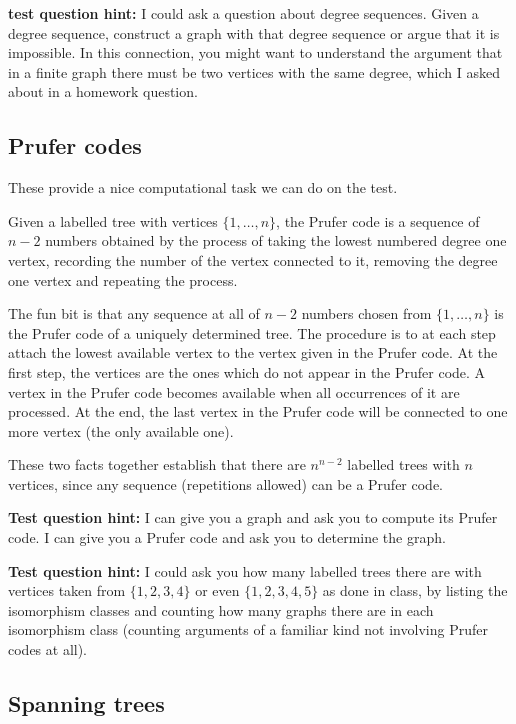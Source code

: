 \documentclass[12pt]{article}
\begin{document}
{\bf test question hint:}  I could ask a question about degree sequences.  Given a degree sequence, construct a graph with that degree sequence or argue that it is impossible.  In this connection, you might want to understand the argument that
in a finite graph there must be two vertices with the same degree, which I asked about in a homework question.

\subsection{Prufer codes}

These provide a nice computational task we can do on the test.

Given a labelled tree with vertices $\{1,\ldots,n\}$, the Prufer code is a sequence of $n-2$ numbers obtained
by the process of taking the lowest numbered degree one vertex, recording the number of the vertex connected to it,
removing the degree one vertex and repeating the process.

The fun bit is that any sequence at all of $n-2$ numbers chosen from $\{1,\ldots,n\}$ is the Prufer code of a uniquely determined tree.  The procedure is to at each step attach the lowest available vertex to the vertex given in the Prufer code.
At the first step, the vertices are the ones which do not appear in the Prufer code.  A vertex in the Prufer code becomes
available when all occurrences of it are processed.  At the end, the last vertex in the Prufer code will be connected to one more vertex (the only available one).

These two facts together establish that there are $n^{n-2}$ labelled trees with $n$ vertices, since any sequence (repetitions allowed) can be a Prufer code.

{\bf Test question hint:}  I can give you a graph and ask you to compute its Prufer code.  I can give you a Prufer code and ask you to determine the graph.

{\bf Test question hint:}  I could ask you how many labelled trees there are with vertices taken from $\{ 1,2,3,4\}$ or even
$\{1,2,3,4,5\}$ as done in class, by listing the isomorphism classes and counting how many graphs there are in each isomorphism class (counting arguments of a familiar kind not involving Prufer codes at all).

\subsection{Spanning trees}
\end{document}
